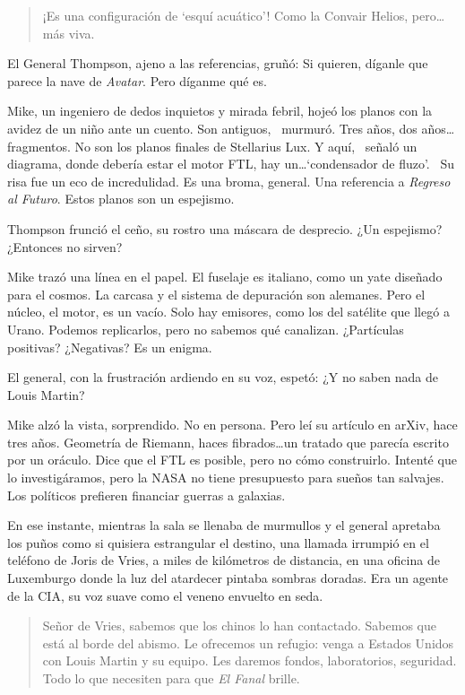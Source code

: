 \documentclass{book}
\begin{document}
\begin{quote}
\calli
\glqq ¡Es una configuración de `esquí acuático'! Como la Convair Helios, pero\ldots más viva.\grqq
\end{quote}

El General Thompson, ajeno a las referencias, gruñó: \glqq Si quieren, díganle que parece la nave de \emph{Avatar}. Pero díganme qué es.\grqq

Mike, un ingeniero de dedos inquietos y mirada febril, hojeó los planos con la avidez de un niño ante un cuento. \glqq Son antiguos,\grqq~ murmuró. \glqq Tres años, dos años\ldots fragmentos. No son los planos finales de Stellarius Lux. Y aquí,\grqq~ señaló un diagrama, \glqq donde debería estar el motor FTL, hay un\ldots `condensador de fluzo'.\grqq~ Su risa fue un eco de incredulidad. \glqq Es una broma, general. Una referencia a \emph{Regreso al Futuro}. Estos planos son un espejismo.\grqq

Thompson frunció el ceño, su rostro una máscara de desprecio. \glqq ¿Un espejismo? ¿Entonces no sirven?\grqq

Mike trazó una línea en el papel. \glqq El fuselaje es italiano, como un yate diseñado para el cosmos. La carcasa y el sistema de depuración son alemanes. Pero el núcleo, el motor, es un vacío. Solo hay emisores, como los del satélite que llegó a Urano. Podemos replicarlos, pero no sabemos qué canalizan. ¿Partículas positivas? ¿Negativas? Es un enigma.\grqq

El general, con la frustración ardiendo en su voz, espetó: \glqq ¿Y no saben nada de Louis Martin?\grqq

Mike alzó la vista, sorprendido. \glqq No en persona. Pero leí su artículo en arXiv, hace tres años. Geometría de Riemann, haces fibrados\ldots un tratado que parecía escrito por un oráculo. Dice que el FTL es posible, pero no cómo construirlo. Intenté que lo investigáramos, pero la NASA no tiene presupuesto para sueños tan salvajes. Los políticos prefieren financiar guerras a galaxias.\grqq

En ese instante, mientras la sala se llenaba de murmullos y el general apretaba los puños como si quisiera estrangular el destino, una llamada irrumpió en el teléfono de Joris de Vries, a miles de kilómetros de distancia, en una oficina de Luxemburgo donde la luz del atardecer pintaba sombras doradas. Era un agente de la CIA, su voz suave como el veneno envuelto en seda.

\begin{quote}
\calli
\glqq Señor de Vries, sabemos que los chinos lo han contactado. Sabemos que está al borde del abismo. Le ofrecemos un refugio: venga a Estados Unidos con Louis Martin y su equipo. Les daremos fondos, laboratorios, seguridad. Todo lo que necesiten para que \emph{El Fanal} brille.\grqq
\end{quote}
\end{document}
